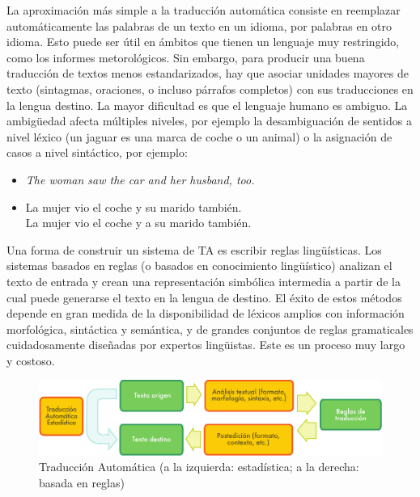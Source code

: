 \begin{multicols}{2}

La aproximación más simple a la traducción automática consiste en reemplazar automáticamente las palabras de un texto en un idioma, por palabras en otro idioma. Esto puede ser útil en ámbitos que tienen un lenguaje muy restringido, como los informes metorológicos. Sin embargo, para producir una buena traducción de textos menos estandarizados, hay que asociar unidades mayores de texto (sintagmas, oraciones, o incluso párrafos completos) con sus traducciones en la lengua destino. La mayor dificultad es que el lenguaje humano es ambiguo. La ambigüedad afecta múltiples niveles, por ejemplo la desambiguación de sentidos a nivel léxico (un jaguar es una marca de coche o un animal) o la asignación de casos a nivel sintáctico, por ejemplo:

\begin{itemize}
  \item \textit{The woman saw the car and her husband, too.}
  \item La mujer vio el coche y su marido también.\\
    La mujer vio el coche y a su marido también.
\end{itemize}

Una forma de construir un sistema de TA es escribir reglas lingüísticas. Los sistemas basados en reglas (o basados en conocimiento lingüístico) analizan el texto de entrada y crean una representación simbólica intermedia a partir de la cual puede generarse el texto en la lengua de destino. El éxito de estos métodos depende en gran medida de la disponibilidad de léxicos amplios con información morfológica, sintáctica y semántica, y de grandes conjuntos de reglas gramaticales cuidadosamente diseñadas por expertos lingüistas. Este es un proceso muy largo y costoso.

\begin{figure}[htb]
  \center
  \includegraphics[width=\textwidth]{../_media/spanish/machine_translation}
  \caption{Traducción Automática (a la izquierda: estadística; a la derecha: basada en reglas)}
  \label{fig:mtarch_de}
\end{figure}


\end{multicols}
